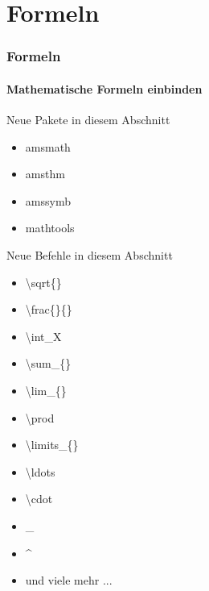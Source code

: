 \section{Formeln}
\begin{frame}
\frametitle{Formeln}
\framesubtitle{Mathematische Formeln einbinden}

\begin{exampleblock}{Neue Pakete in diesem Abschnitt}
\begin{multicols}{2}
\begin{itemize}
\item amsmath 
\item amsthm
\item amssymb
\item mathtools
\end{itemize}
\end{multicols}
\end{exampleblock}

\begin{block}{Neue Befehle in diesem Abschnitt}
\begin{multicols}{2}
\begin{itemize}
\item \color{nounibaredI}\textbackslash sqrt\color{black}\{\}
\item \color{nounibaredI}\textbackslash frac\color{black}\{\}\{\}
\item \color{nounibaredI}\textbackslash int\color{black}\_X
\item \color{nounibaredI}\textbackslash sum\color{black}\_\{\}
\item \color{nounibaredI}\textbackslash lim\color{black}\_\{\}
\item \color{nounibaredI}\textbackslash prod\color{black}
\item \color{nounibaredI}\textbackslash limits\color{black}\_\{\}
\item \color{nounibaredI}\textbackslash ldots\color{black}
\item \color{nounibaredI}\textbackslash cdot\color{black}
\item \color{nounibaredI}\_\color{black}
\item \color{nounibaredI}\^~\color{black}
\item und viele mehr ...
\end{itemize}
\end{multicols}
\end{block}

\end{frame}

